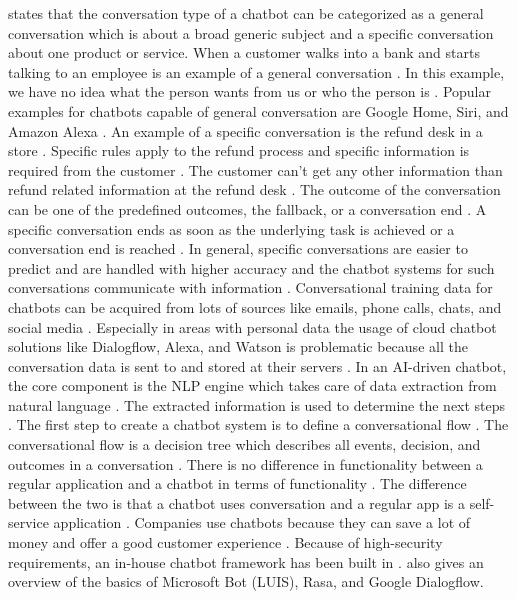 \citet{singhbuilding} states that the conversation type of a chatbot can be categorized as a general conversation 
which is about a broad generic subject and a specific conversation about one product or service.
When a customer walks into a bank and starts talking to an employee is an example of a general conversation \cite{singhbuilding}.
In this example, we have no idea what the person wants from us or who the person is \cite{singhbuilding}.
Popular examples for chatbots capable of general conversation are Google Home, Siri, and Amazon Alexa \cite{singhbuilding}.
An example of a specific conversation is the refund desk in a store \cite{singhbuilding}. 
Specific rules apply to the refund process and specific information is required from the customer \cite{singhbuilding}. 
The customer can't get any other information than refund related information at the refund desk \cite{singhbuilding}. 
The outcome of the conversation can be one of the predefined outcomes, the fallback, or a conversation end \cite{singhbuilding}. 
A specific conversation ends as soon as the underlying task is achieved or a conversation end is reached \cite{singhbuilding}. 
In general, specific conversations are easier to predict and are handled with higher accuracy and the chatbot systems 
for such conversations communicate with information \cite{singhbuilding}. 
Conversational training data for chatbots can be acquired from lots of sources like emails, phone calls, chats, and social media \cite{singhbuilding}.
Especially in areas with personal data the usage of cloud chatbot solutions like Dialogflow, Alexa, and Watson 
is problematic because all the conversation data is sent to and stored at their servers \cite{singhbuilding}.
In an AI-driven chatbot, the core component is the NLP engine which takes care of data extraction from natural language \cite{singhbuilding}.
The extracted information is used to determine the next steps \cite{singhbuilding}.
The first step to create a chatbot system is to define a conversational flow \cite{singhbuilding}.
The conversational flow is a decision tree which describes all events, decision, and outcomes in a conversation \cite{singhbuilding}.
There is no difference in functionality between a regular application and a chatbot in terms of functionality \cite{singhbuilding}. 
The difference between the two is that a chatbot uses conversation and a regular app is a self-service application \cite{singhbuilding}. 
Companies use chatbots because they can save a lot of money and offer a good customer experience \cite{singhbuilding}.
Because of high-security requirements, an in-house chatbot framework has been built in \citet{singhbuilding}.
\citet{singhbuilding} also gives an overview of the basics of Microsoft Bot (LUIS), Rasa, and Google Dialogflow.

